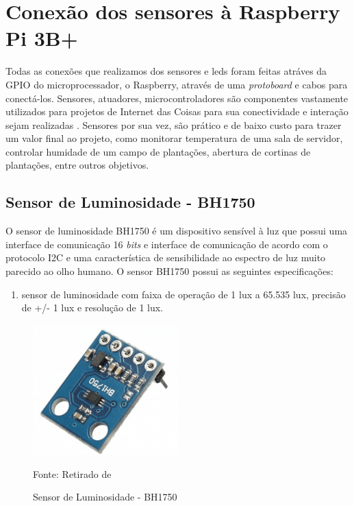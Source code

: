 \documentclass[../../layout.tex]{subfiles}
\begin{document}
\section{Conexão dos sensores à Raspberry Pi 3B+}
\hspace*{3em}Todas as conexões que realizamos dos sensores e leds foram feitas atráves da GPIO do microprocessador, o Raspberry, através de uma \emph{protoboard} e cabos para conectá-los.
\hspace*{3em}Sensores, atuadores, microcontroladores são componentes vastamente utilizados para projetos de Internet das Coisas para sua conectividade e interação sejam realizadas \cite{sensores_iot}. Sensores por sua vez, são prático e de baixo custo para trazer um valor final ao projeto, como monitorar temperatura de uma sala de servidor, controlar humidade de um campo de plantações, abertura de cortinas de plantações, entre outros objetivos.
\subsection{Sensor de Luminosidade - BH1750}
\hspace*{3em}O sensor de luminosidade BH1750 é um dispositivo sensível à luz que possui uma interface de comunicação 16 \emph{bits} e interface de comunicação de acordo com o protocolo I2C e uma característica de sensibilidade ao espectro de luz muito parecido ao olho humano.
\hspace*{3em}O sensor BH1750 possui as seguintes especificações:
\begin{enumerate}[label=\alph*)]
\itemsep0em
    \item sensor de luminosidade com faixa de operação de 1 lux a 65.535 lux, precisão de +/- 1 lux e resolução de 1 lux.
\end{enumerate}

\begin{figure}[H]
\centering
\caption{Sensor de Luminosidade - BH1750}
\includegraphics[width=0.5\textwidth]{assets/static/img/BH1750.jpg}
\label{fig:BH1750}

\begin{minipage}{0.5\textwidth}
\raggedright \footnotesize Fonte: Retirado de \cite{BH1750} 
\end{minipage}
\end{figure}
\end{document}
